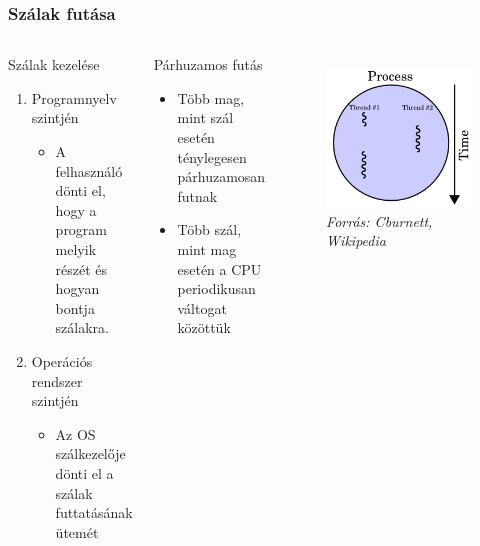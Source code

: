 \begin{frame}
\frametitle{Szálak futása}

\begin{columns}
	\begin{block}{Szálak kezelése}
		{\small
		\begin{enumerate}
			\item Programnyelv szintjén
			\begin{itemize}
				\item A felhasználó dönti el, hogy a program melyik részét és hogyan bontja szálakra.
			\end{itemize}
			\item Operációs rendszer szintjén
			\begin{itemize}
				\item Az OS szálkezelője dönti el a szálak futtatásának ütemét
			\end{itemize}
		\end{enumerate}
		}
	\end{block}

	\begin{block}{Párhuzamos futás}
		{\small
		\begin{itemize}
			\item Több mag, mint szál esetén ténylegesen párhuzamosan futnak
			\item Több szál, mint mag esetén a CPU periodikusan váltogat közöttük
		\end{itemize}
		}
	\end{block}
	
	\begin{figure}
		\includegraphics[width=\textwidth]{img/thread-serial.png}
		{\hspace*{\fill}\tiny\textit{Forrás: Cburnett, Wikipedia}}
	\end{figure}
	
\end{columns}

\end{frame}